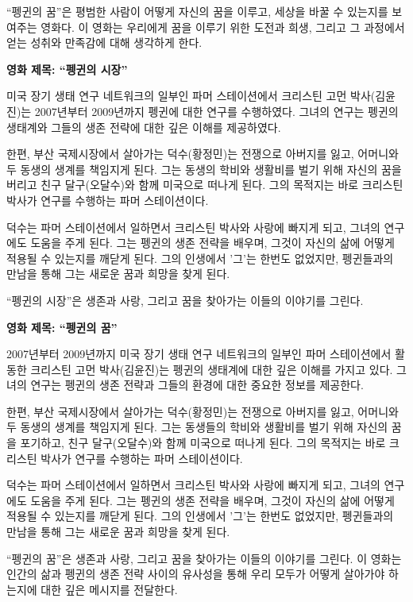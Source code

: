 \documentclass[
  letterpaper,
]{book}
\begin{document}
\begin{tcolorbox}
``펭귄의 꿈''은 평범한 사람이 어떻게 자신의 꿈을 이루고, 세상을 바꿀 수
있는지를 보여주는 영화다. 이 영화는 우리에게 꿈을 이루기 위한 도전과
희생, 그리고 그 과정에서 얻는 성취와 만족감에 대해 생각하게 한다.

\textbf{영화 제목: ``펭귄의 시장''}

미국 장기 생태 연구 네트워크의 일부인 파머 스테이션에서 크리스틴 고먼
박사(김윤진)는 2007년부터 2009년까지 펭귄에 대한 연구를 수행하였다.
그녀의 연구는 펭귄의 생태계와 그들의 생존 전략에 대한 깊은 이해를
제공하였다.

한편, 부산 국제시장에서 살아가는 덕수(황정민)는 전쟁으로 아버지를 잃고,
어머니와 두 동생의 생계를 책임지게 된다. 그는 동생의 학비와 생활비를
벌기 위해 자신의 꿈을 버리고 친구 달구(오달수)와 함께 미국으로 떠나게
된다. 그의 목적지는 바로 크리스틴 박사가 연구를 수행하는 파머
스테이션이다.

덕수는 파머 스테이션에서 일하면서 크리스틴 박사와 사랑에 빠지게 되고,
그녀의 연구에도 도움을 주게 된다. 그는 펭귄의 생존 전략을 배우며, 그것이
자신의 삶에 어떻게 적용될 수 있는지를 깨닫게 된다. 그의 인생에서 '그'는
한번도 없었지만, 펭귄들과의 만남을 통해 그는 새로운 꿈과 희망을 찾게
된다.

``펭귄의 시장''은 생존과 사랑, 그리고 꿈을 찾아가는 이들의 이야기를
그린다.

\textbf{영화 제목: ``펭귄의 꿈''}

2007년부터 2009년까지 미국 장기 생태 연구 네트워크의 일부인 파머
스테이션에서 활동한 크리스틴 고먼 박사(김윤진)는 펭귄의 생태계에 대한
깊은 이해를 가지고 있다. 그녀의 연구는 펭귄의 생존 전략과 그들의 환경에
대한 중요한 정보를 제공한다.

한편, 부산 국제시장에서 살아가는 덕수(황정민)는 전쟁으로 아버지를 잃고,
어머니와 두 동생의 생계를 책임지게 된다. 그는 동생들의 학비와 생활비를
벌기 위해 자신의 꿈을 포기하고, 친구 달구(오달수)와 함께 미국으로 떠나게
된다. 그의 목적지는 바로 크리스틴 박사가 연구를 수행하는 파머
스테이션이다.

덕수는 파머 스테이션에서 일하면서 크리스틴 박사와 사랑에 빠지게 되고,
그녀의 연구에도 도움을 주게 된다. 그는 펭귄의 생존 전략을 배우며, 그것이
자신의 삶에 어떻게 적용될 수 있는지를 깨닫게 된다. 그의 인생에서 '그'는
한번도 없었지만, 펭귄들과의 만남을 통해 그는 새로운 꿈과 희망을 찾게
된다.

``펭귄의 꿈''은 생존과 사랑, 그리고 꿈을 찾아가는 이들의 이야기를
그린다. 이 영화는 인간의 삶과 펭귄의 생존 전략 사이의 유사성을 통해 우리
모두가 어떻게 살아가야 하는지에 대한 깊은 메시지를 전달한다.


\end{tcolorbox}
\end{document}
